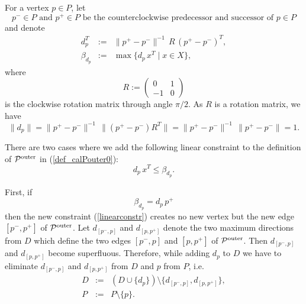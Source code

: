 \documentclass[12pt]{article}
\begin{document}
For a vertex $p \in P$, let
\begin{equation}\label{def_p-p+}
\mbox{$p^- \in P$ and $p^+ \in P$ be the counterclockwise predecessor and successor of $p\in P$}
\end{equation}
and denote
\begin{equation}\label{def_d_p}
\begin{array}{lcl}
d_{p}^T &:=& \|p^+ - p^-\|^{-1}\, R \, (p^+ - p^-)^T, \\
\beta_{d_{p}} &:=& \max\{d_{p}\, x^T \mid x \in X\},
\end{array}
\end{equation}
where 
\begin{equation}\label{rotationmatrix}
R := \begin{pmatrix}
0 & 1 \\
-1 & 0
\end{pmatrix}
\end{equation}
is the clockwise rotation matrix through angle $\pi/2$.
As $R$ is a rotation matrix, we  have
\begin{equation}\label{def_d_p1}
\|d_{p}\| = \|p^+ - p^-\|^{-1}\, \|(p^+ - p^-) R^T\| = \|p^+ - p^-\|^{-1}\, \|p^+ - p^-\| = 1.
\end{equation}

There are two cases where we add the following linear constraint to the definition of ${\cal P}^{\rm outer}$ in (\ref{def_calPouter0}):
\begin{equation}\label{linearconstr}
d_p\, x^T \leq \beta_{d_p}.
\end{equation}

First, if
\begin{equation}\label{betaequal}
\beta_{d_p} = d_p\, p^+
\end{equation}
then the new constraint (\ref{linearconstr}) creates no new vertex but the new edge $[p^-, p^+]$ of ${\cal P}^{\rm outer}$.
Let $d_{[p^-, p]}$ and $d_{[p, p^+]}$ denote the two maximum directions from $D$ which define the two edges $[p^-, p]$ and $[ p, p^+]$ of ${\cal P}^{\rm outer}$. Then $d_{[p^-, p]}$ and $d_{[p, p^+]}$ become superfluous. Therefore, while adding $d_p$ to $D$ we have to eliminate $d_{[p^-, p]}$ and $d_{[p, p^+]}$ from $D$ and $p$ from $P$, i.e.
\begin{equation}\label{newDP2}
\begin{array}{lcl}
D &:=& (D \cup \{d_{p}\})\setminus \{d_{[p^-,p]}, d_{[p,p^+]}\}, \\
P &:=& P \setminus \{p\}.
\end{array}
\end{equation}
\end{document}
